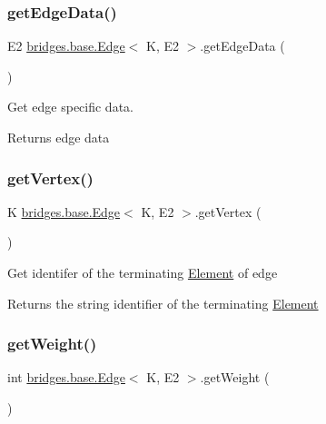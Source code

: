 \subsubsection{\texorpdfstring{get\+Edge\+Data()}{getEdgeData()}}
{\footnotesize\ttfamily E2 \mbox{\hyperlink{classbridges_1_1base_1_1_edge}{bridges.\+base.\+Edge}}$<$ K, E2 $>$.get\+Edge\+Data (\begin{DoxyParamCaption}{ }\end{DoxyParamCaption})}

Get edge specific data.

\begin{DoxyReturn}{Returns}
edge data 
\end{DoxyReturn}
\mbox{\label{classbridges_1_1base_1_1_edge_a77eee3cc9fc7c00bc08388cd0f748285}} 
\subsubsection{\texorpdfstring{get\+Vertex()}{getVertex()}}
{\footnotesize\ttfamily K \mbox{\hyperlink{classbridges_1_1base_1_1_edge}{bridges.\+base.\+Edge}}$<$ K, E2 $>$.get\+Vertex (\begin{DoxyParamCaption}{ }\end{DoxyParamCaption})}

Get identifer of the terminating \mbox{\hyperlink{classbridges_1_1base_1_1_element}{Element}} of edge

\begin{DoxyReturn}{Returns}
the string identifier of the terminating \mbox{\hyperlink{classbridges_1_1base_1_1_element}{Element}} 
\end{DoxyReturn}
\mbox{\label{classbridges_1_1base_1_1_edge_a63ad33282f3ae3ce48fb3fc8781b9916}} 
\subsubsection{\texorpdfstring{get\+Weight()}{getWeight()}}
{\footnotesize\ttfamily int \mbox{\hyperlink{classbridges_1_1base_1_1_edge}{bridges.\+base.\+Edge}}$<$ K, E2 $>$.get\+Weight (\begin{DoxyParamCaption}{ }\end{DoxyParamCaption})}

